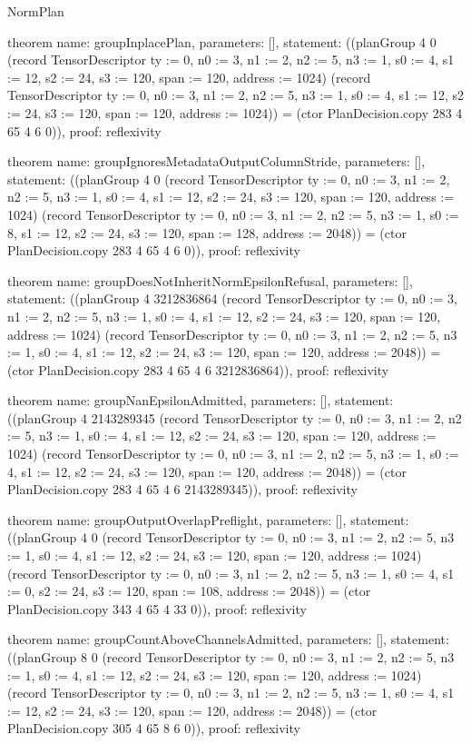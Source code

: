 \begin{lexlean}{NormPlan}
\begin{semanticmodule}
theorem{
  name: groupInplacePlan,
  parameters: [],
  statement: ((planGroup 4 0 (record TensorDescriptor {ty := 0, n0 := 3, n1 := 2, n2 := 5, n3 := 1, s0 := 4, s1 := 12, s2 := 24, s3 := 120, span := 120, address := 1024}) (record TensorDescriptor {ty := 0, n0 := 3, n1 := 2, n2 := 5, n3 := 1, s0 := 4, s1 := 12, s2 := 24, s3 := 120, span := 120, address := 1024})) = (ctor PlanDecision.copy 283 4 65 4 6 0)),
  proof: reflexivity{}
}

theorem{
  name: groupIgnoresMetadataOutputColumnStride,
  parameters: [],
  statement: ((planGroup 4 0 (record TensorDescriptor {ty := 0, n0 := 3, n1 := 2, n2 := 5, n3 := 1, s0 := 4, s1 := 12, s2 := 24, s3 := 120, span := 120, address := 1024}) (record TensorDescriptor {ty := 0, n0 := 3, n1 := 2, n2 := 5, n3 := 1, s0 := 8, s1 := 12, s2 := 24, s3 := 120, span := 128, address := 2048})) = (ctor PlanDecision.copy 283 4 65 4 6 0)),
  proof: reflexivity{}
}

theorem{
  name: groupDoesNotInheritNormEpsilonRefusal,
  parameters: [],
  statement: ((planGroup 4 3212836864 (record TensorDescriptor {ty := 0, n0 := 3, n1 := 2, n2 := 5, n3 := 1, s0 := 4, s1 := 12, s2 := 24, s3 := 120, span := 120, address := 1024}) (record TensorDescriptor {ty := 0, n0 := 3, n1 := 2, n2 := 5, n3 := 1, s0 := 4, s1 := 12, s2 := 24, s3 := 120, span := 120, address := 2048})) = (ctor PlanDecision.copy 283 4 65 4 6 3212836864)),
  proof: reflexivity{}
}

theorem{
  name: groupNanEpsilonAdmitted,
  parameters: [],
  statement: ((planGroup 4 2143289345 (record TensorDescriptor {ty := 0, n0 := 3, n1 := 2, n2 := 5, n3 := 1, s0 := 4, s1 := 12, s2 := 24, s3 := 120, span := 120, address := 1024}) (record TensorDescriptor {ty := 0, n0 := 3, n1 := 2, n2 := 5, n3 := 1, s0 := 4, s1 := 12, s2 := 24, s3 := 120, span := 120, address := 2048})) = (ctor PlanDecision.copy 283 4 65 4 6 2143289345)),
  proof: reflexivity{}
}

theorem{
  name: groupOutputOverlapPreflight,
  parameters: [],
  statement: ((planGroup 4 0 (record TensorDescriptor {ty := 0, n0 := 3, n1 := 2, n2 := 5, n3 := 1, s0 := 4, s1 := 12, s2 := 24, s3 := 120, span := 120, address := 1024}) (record TensorDescriptor {ty := 0, n0 := 3, n1 := 2, n2 := 5, n3 := 1, s0 := 4, s1 := 0, s2 := 24, s3 := 120, span := 108, address := 2048})) = (ctor PlanDecision.copy 343 4 65 4 33 0)),
  proof: reflexivity{}
}

theorem{
  name: groupCountAboveChannelsAdmitted,
  parameters: [],
  statement: ((planGroup 8 0 (record TensorDescriptor {ty := 0, n0 := 3, n1 := 2, n2 := 5, n3 := 1, s0 := 4, s1 := 12, s2 := 24, s3 := 120, span := 120, address := 1024}) (record TensorDescriptor {ty := 0, n0 := 3, n1 := 2, n2 := 5, n3 := 1, s0 := 4, s1 := 12, s2 := 24, s3 := 120, span := 120, address := 2048})) = (ctor PlanDecision.copy 305 4 65 8 6 0)),
  proof: reflexivity{}
}


\end{semanticmodule}
\end{lexlean}
